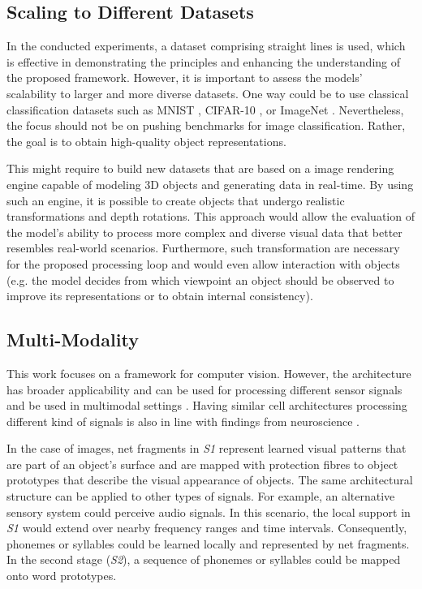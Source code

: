 \subsection{Scaling to Different Datasets}
In the conducted experiments, a dataset comprising straight lines is used, which is effective in demonstrating the principles and enhancing the understanding of the proposed framework.
However, it is important to assess the models' scalability to larger and more diverse datasets.
One way could be to use classical classification datasets such as MNIST , CIFAR-10 , or ImageNet .
Nevertheless, the focus should not be on pushing benchmarks for image classification.
Rather, the goal is to obtain high-quality object representations.

This might require to build new datasets that are based on a image rendering engine capable of modeling 3D objects and generating data in real-time.
By using such an engine, it is possible to create objects that undergo realistic transformations and depth rotations. This approach would allow the evaluation of the model's ability to process more complex and diverse visual data that better resembles real-world scenarios.
Furthermore, such transformation are necessary for the proposed processing loop and would even allow interaction with objects (e.g. the model decides from which viewpoint an object should be observed to improve its representations or to obtain internal consistency).



\subsection{Multi-Modality}
This work focuses on a framework for computer vision. However, the architecture has broader applicability and can be used for processing different sensor signals and be used in multimodal settings \cite{ngiam_multimodal_2011, liu_learn_2018, baltrusaitis_multimodal_2019}.
Having similar cell architectures processing different kind of signals is also in line with findings from neuroscience .

In the case of images, net fragments in \emph{S1} represent learned visual patterns that are part of an object's surface and are mapped with protection fibres to object prototypes that describe the visual appearance of objects. 
The same architectural structure can be applied to other types of signals. For example, an alternative sensory system could perceive audio signals. In this scenario, the local support in \emph{S1} would extend over nearby frequency ranges and time intervals. Consequently, phonemes or syllables could be learned locally and represented by net fragments. In the second stage (\emph{S2}), a sequence of phonemes or syllables could be mapped onto word prototypes.

